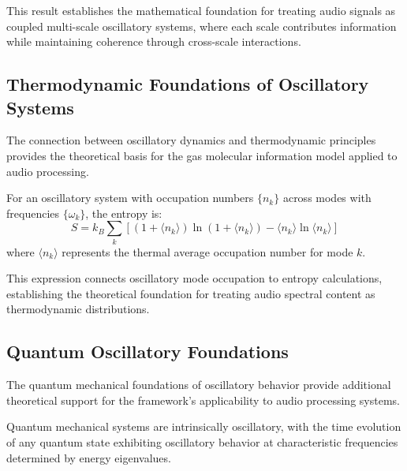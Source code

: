 This result establishes the mathematical foundation for treating audio signals as coupled multi-scale oscillatory systems, where each scale contributes information while maintaining coherence through cross-scale interactions.

\subsection{Thermodynamic Foundations of Oscillatory Systems}

The connection between oscillatory dynamics and thermodynamic principles provides the theoretical basis for the gas molecular information model applied to audio processing.

\begin{definition}
For an oscillatory system with occupation numbers $\{n_k\}$ across modes with frequencies $\{\omega_k\}$, the entropy is:
\begin{equation}
S = k_B \sum_k \left[(1 + \langle n_k\rangle)\ln(1 + \langle n_k\rangle) - \langle n_k\rangle\ln\langle n_k\rangle\right]
\end{equation}
where $\langle n_k\rangle$ represents the thermal average occupation number for mode $k$.
\end{definition}

This expression connects oscillatory mode occupation to entropy calculations, establishing the theoretical foundation for treating audio spectral content as thermodynamic distributions.


\subsection{Quantum Oscillatory Foundations}

The quantum mechanical foundations of oscillatory behavior provide additional theoretical support for the framework's applicability to audio processing systems.

\begin{theorem}
Quantum mechanical systems are intrinsically oscillatory, with the time evolution of any quantum state exhibiting oscillatory behavior at characteristic frequencies determined by energy eigenvalues.
\end{theorem}

